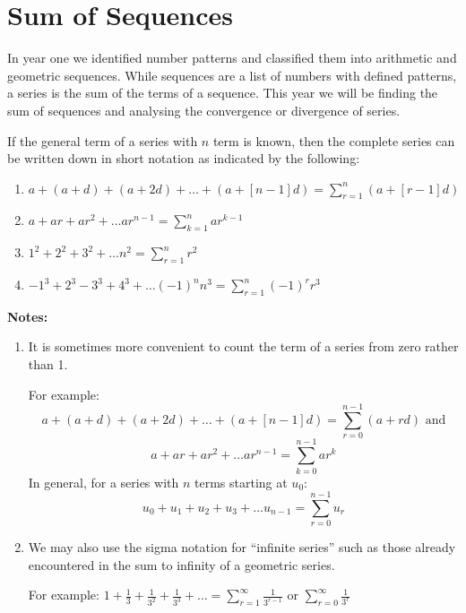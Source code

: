 \section{Sum of Sequences}

In year one we identified number patterns and classified them into arithmetic and
geometric sequences. While sequences are a list of numbers with defined patterns,
a series is the sum of the terms of a sequence. This year we will be finding the
sum of sequences and analysing the convergence or divergence of series.

If the general term of a series with $n$ term is known, then the complete series can
be written down in short notation as indicated by the following:
\begin{enumerate}
  \item $a + (a+d) + (a+2d) + \ldots + (a+[n-1]d) = \sum_{r=1}^{n} (a+[r-1]d)$
  \item $a + ar + ar^2 + \ldots ar^{n-1} = \sum_{k=1}^{n} ar^{k-1}$
  \item $1^2 + 2^2 + 3^2 + \ldots n^2 = \sum_{r=1}^{n} r^2$
  \item $-1^3 + 2^3 - 3^3 + 4^3 + \ldots (-1)^n n^3 = \sum_{r=1}^{n} (-1)^r r^3$
\end{enumerate}

\noindent\textbf{Notes:}
\begin{enumerate}
  \item[a.] It is sometimes more convenient to count the term of a series from zero
  rather than 1.

  For example:
  \[
    a + (a+d) + (a+2d) + \ldots + (a+[n-1]d) = \sum_{r=0}^{n-1} (a+rd) \text{ and}
  \]
  \[
    a + ar + ar^2 + \ldots ar^{n-1} = \sum_{k=0}^{n-1} ar^{k}
  \]
  In general, for a series with $n$ terms starting at $u_0$:
  \[
    u_0 + u_1 + u_2 + u_3 + \ldots u_{n-1} = \sum_{r=0}^{n-1} u_r
  \]
  \item[b.] We may also use the sigma notation for ``infinite series'' such as those already
  encountered in the sum to infinity of a geometric series.

  For example: $1 + \frac{1}{3} + \frac{1}{3^2} + \frac{1}{3^3} + \ldots = \sum_{r=1}^{\infty} \frac{1}{3^{r-1}}$
  or $\sum_{r=0}^{\infty} \frac{1}{3^{r}}$
\end{enumerate}

